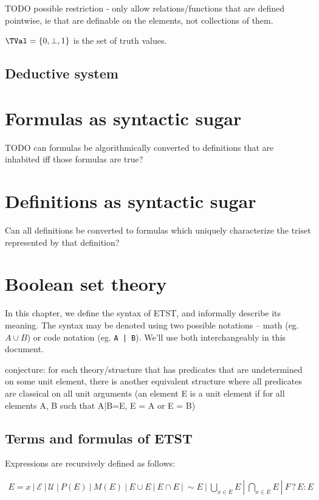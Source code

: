 \documentclass[oneside,12pt]{book}
\theoremstyle{definition}
\theoremstyle{remark}
\newcommand{\ct}{{\sim}} %
\newcommand{\pSet}{P}
\newcommand{\mSet}{M}
\newcommand{\conditional}[3]{#1 \mathrel{?} #2 : #3}
\newcommand{\Empty}{\mathcal{E}}
\newcommand{\Universal}{\mathcal{U}}
\begin{document}
TODO possible restriction - only allow relations/functions that are defined pointwise,
ie that are definable on the elements, not collections of them.

\begin{defBox}
  $\TVal = \{ 0, \bot, 1 \}$ is the set of truth values.
\end{defBox}

\section{Deductive system}


\chapter{Formulas as syntactic sugar}
TODO can formulas be algorithmically converted to definitions that are inhabited
iff those formulas are true?


\chapter{Definitions as syntactic sugar}
Can all definitions be converted to formulas which uniquely characterize
the triset represented by that definition?


\chapter{Boolean set theory}
In this chapter, we define the syntax of ETST, and informally describe its meaning.
The syntax may be denoted using two possible notations -- math (eg. $A \cup B$)
or code notation (eg. \texttt{A | B}). We'll use both interchangeably in this document.

conjecture: for each theory/structure that has predicates that are undetermined
on some unit element, there is another equivalent structure where all predicates
are classical on all unit arguments (an element E is a unit element if for all
elements A, B such that A|B=E, E = A or E = B)

\section{Terms and formulas of ETST}
Expressions are recursively defined as follows:

\begin{align*}
  E = x~|~\Empty~|~\Universal~|~\pSet(E)~|~\mSet(E)~|~E \cup E~|~E \cap E~|~\ct E%
  ~|~\bigcup_{x \in E}E~|~\bigcap_{x \in E}E~|~\conditional{F}{E}{E}
\end{align*}
\end{document}
